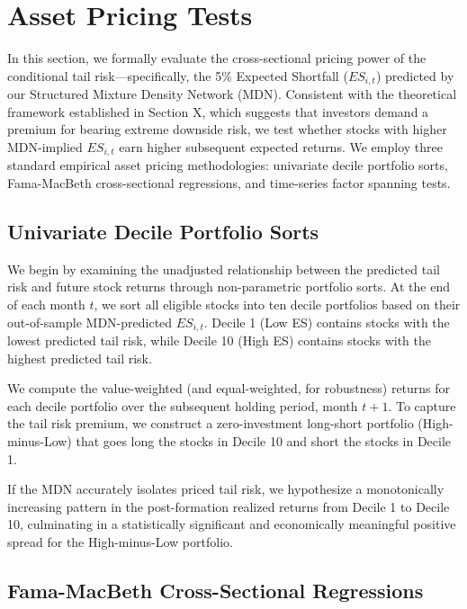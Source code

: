\documentclass[12pt]{article}
\begin{document}


\section{Asset Pricing Tests}
\label{sec:asset_pricing_tests}

In this section, we formally evaluate the cross-sectional pricing power of the conditional tail risk—specifically, the 5\% Expected Shortfall ($ES_{i,t}$) predicted by our Structured Mixture Density Network (MDN). Consistent with the theoretical framework established in Section X, which suggests that investors demand a premium for bearing extreme downside risk, we test whether stocks with higher MDN-implied $ES_{i,t}$ earn higher subsequent expected returns. We employ three standard empirical asset pricing methodologies: univariate decile portfolio sorts, Fama-MacBeth cross-sectional regressions, and time-series factor spanning tests.

\subsection{Univariate Decile Portfolio Sorts}
\label{subsec:decile_sorts}

We begin by examining the unadjusted relationship between the predicted tail risk and future stock returns through non-parametric portfolio sorts. At the end of each month $t$, we sort all eligible stocks into ten decile portfolios based on their out-of-sample MDN-predicted $ES_{i,t}$. Decile 1 (Low ES) contains stocks with the lowest predicted tail risk, while Decile 10 (High ES) contains stocks with the highest predicted tail risk. 

We compute the value-weighted (and equal-weighted, for robustness) returns for each decile portfolio over the subsequent holding period, month $t+1$. To capture the tail risk premium, we construct a zero-investment long-short portfolio (High-minus-Low) that goes long the stocks in Decile 10 and short the stocks in Decile 1. 

If the MDN accurately isolates priced tail risk, we hypothesize a monotonically increasing pattern in the post-formation realized returns from Decile 1 to Decile 10, culminating in a statistically significant and economically meaningful positive spread for the High-minus-Low portfolio.

\subsection{Fama-MacBeth Cross-Sectional Regressions}
\label{subsec:fama_macbeth}
\end{document}
